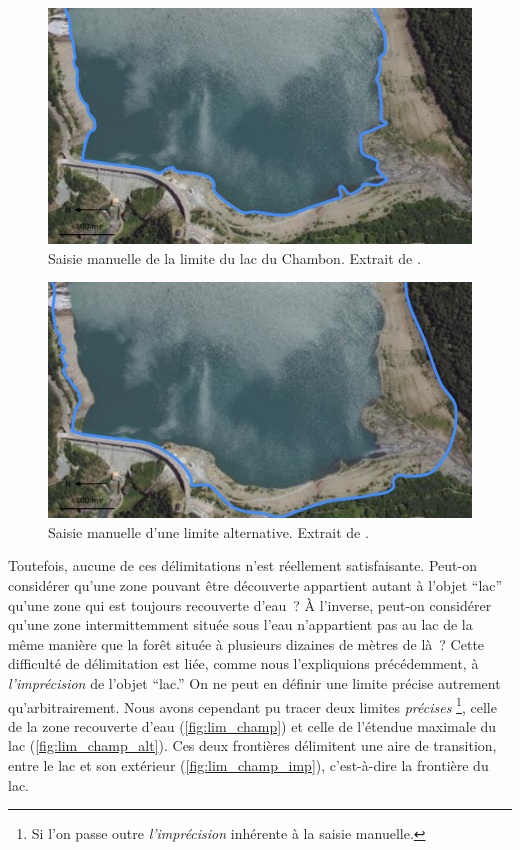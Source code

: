 \begin{figure}
  \centering
  \includegraphics{../figures/fig1.png}
  \caption{Saisie manuelle de la limite du lac du Chambon. Extrait de
    \textcite{Bunel2020}.}
  \label{fig:lim_champ}
\end{figure}

\begin{figure}
  \centering
  \includegraphics{../figures/fig2.png}
  \caption{Saisie manuelle d'une limite alternative. Extrait de
    \textcite{Bunel2020}.}
  \label{fig:lim_champ_alt}
\end{figure}

Toutefois, aucune de ces délimitations n’est réellement
satisfaisante. Peut-on considérer qu’une zone pouvant être découverte
appartient autant à l’objet \enquote{lac} qu’une zone qui est toujours
recouverte d’eau ? À l’inverse, peut-on considérer qu’une zone
intermittemment située sous l’eau n’appartient pas au lac de la même
manière que la forêt située à plusieurs dizaines de mètres de là ?
Cette difficulté de délimitation est liée, comme nous l’expliquions
précédemment, à \emph{l’imprécision} de l’objet \enquote{lac.} On ne
peut en définir une limite précise autrement qu’arbitrairement. Nous
avons cependant pu tracer deux limites \emph{précises} \footnote{Si
  l’on passe outre \emph{l’imprécision} inhérente à la saisie
  manuelle.}, celle de la zone recouverte d’eau
(\autoref{fig:lim_champ}) et celle de l’étendue maximale du lac
(\autoref{fig:lim_champ_alt}). Ces deux frontières délimitent une aire
de transition, entre le lac et son extérieur
(\autoref{fig:lim_champ_imp}), c’est-à-dire la frontière du lac.

